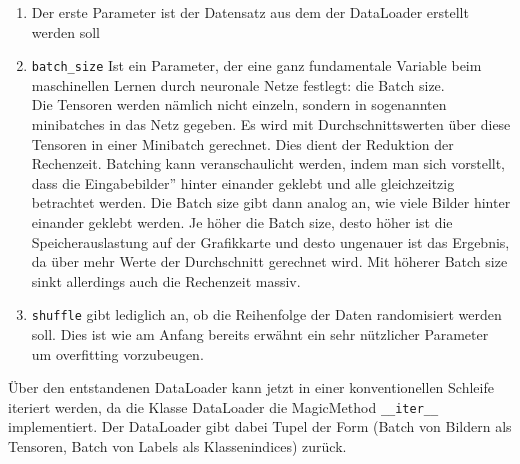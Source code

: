 \documentclass[11pt]{article}
\begin{document}
\begin{enumerate}
	\item Der erste Parameter ist der Datensatz aus dem der DataLoader erstellt werden soll
	\item \texttt{batch_size} Ist ein Parameter, der eine ganz fundamentale Variable beim maschinellen Lernen durch neuronale Netze festlegt: die Batch size.\\
	Die Tensoren werden nämlich nicht einzeln, sondern in sogenannten minibatches in das Netz gegeben. Es wird mit Durchschnittswerten über diese Tensoren in einer Minibatch gerechnet. Dies dient der Reduktion der Rechenzeit. Batching kann veranschaulicht werden, indem man sich vorstellt, dass die \glqq Eingabebilder'' hinter einander geklebt und alle gleichzeitzig betrachtet werden. Die Batch size gibt dann analog an, wie viele Bilder hinter einander geklebt werden. Je höher die Batch size, desto höher ist die Speicherauslastung auf der Grafikkarte und desto ungenauer ist das Ergebnis, da über mehr Werte der Durchschnitt gerechnet wird. Mit höherer Batch size sinkt allerdings auch die Rechenzeit massiv.
	\item \texttt{shuffle} gibt lediglich an, ob die Reihenfolge der Daten randomisiert werden soll. Dies ist wie am Anfang bereits erwähnt ein sehr nützlicher Parameter um overfitting vorzubeugen.
\end{enumerate}
Über den entstandenen DataLoader kann jetzt in einer konventionellen Schleife iteriert werden, da die Klasse DataLoader die MagicMethod \texttt{__iter__} implementiert. Der DataLoader gibt dabei Tupel der Form (Batch von Bildern als Tensoren, Batch von Labels als Klassenindices) zurück.
\end{document}
